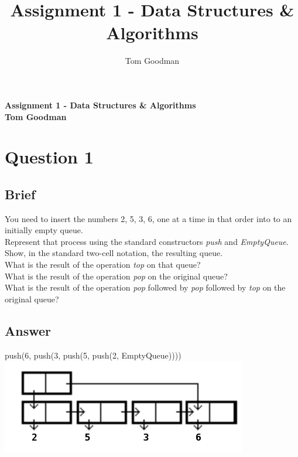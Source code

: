 \documentclass{article}
\title{Assignment 1 - Data Structures \& Algorithms}
\author{Tom Goodman}
\date{}
\begin{document}
\begin{titlepage}
	\begin{flushleft}
		\vspace*{1cm}
		\Huge
		\textbf{Assignment 1 - Data Structures \& Algorithms} \\
		\vspace*{1cm}
		\Large
		\textbf{Tom Goodman} \\
	\end{flushleft}
\end{titlepage}
\newpage
\section{Question 1}
\subsection{Brief}
You need to insert the numbers 2, 5, 3, 6, one at a time in that order into to an initially empty queue.
\\ \newline
Represent that process using the standard constructors \textit{push} and \textit{EmptyQueue}.
\\ \newline
Show, in the standard two-cell notation, the resulting queue.
\\ \newline
What is the result of the operation \textit{top} on that queue?
\\ \newline
What is the result of the operation \textit{pop} on the original queue?
\\ \newline
What is the result of the operation \textit{pop} followed by \textit{pop} followed by \textit{top} on the original queue?

\subsection{Answer}
push(6, push(3, push(5, push(2, EmptyQueue))))
\\ \newline
\includegraphics{DSAE1TwoCell.png}
\\ 
\\ \newline
[5, 3, 6]
\\ 
\end{document}
